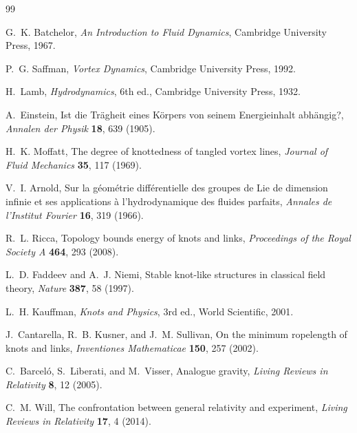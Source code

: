 \documentclass[11pt, a4paper]{article}
\begin{document}
\begin{thebibliography}{99}

G.~K. Batchelor,
\textit{An Introduction to Fluid Dynamics},
Cambridge University Press, 1967.

P.~G. Saffman,
\textit{Vortex Dynamics},
Cambridge University Press, 1992.

H.~Lamb,
\textit{Hydrodynamics}, 6th ed.,
Cambridge University Press, 1932.

A.~Einstein,
Ist die Tr\"{a}gheit eines K\"{o}rpers von seinem Energieinhalt abh\"{a}ngig?,
\textit{Annalen der Physik} \textbf{18}, 639 (1905).

H.~K. Moffatt,
The degree of knottedness of tangled vortex lines,
\textit{Journal of Fluid Mechanics} \textbf{35}, 117 (1969).

V.~I. Arnold,
Sur la g\'{e}om\'{e}trie diff\'{e}rentielle des groupes de Lie de dimension infinie
et ses applications \`{a} l'hydrodynamique des fluides parfaits,
\textit{Annales de l'Institut Fourier} \textbf{16}, 319 (1966).

R.~L. Ricca,
Topology bounds energy of knots and links,
\textit{Proceedings of the Royal Society A} \textbf{464}, 293 (2008).

L.~D. Faddeev and A.~J. Niemi,
Stable knot-like structures in classical field theory,
\textit{Nature} \textbf{387}, 58 (1997).

L.~H. Kauffman,
\textit{Knots and Physics}, 3rd ed.,
World Scientific, 2001.

J.~Cantarella, R.~B. Kusner, and J.~M. Sullivan,
On the minimum ropelength of knots and links,
\textit{Inventiones Mathematicae} \textbf{150}, 257 (2002).

C.~Barceló, S.~Liberati, and M.~Visser,
Analogue gravity,
\textit{Living Reviews in Relativity} \textbf{8}, 12 (2005).

C.~M. Will,
The confrontation between general relativity and experiment,
\textit{Living Reviews in Relativity} \textbf{17}, 4 (2014).


\end{thebibliography}
\end{document}

